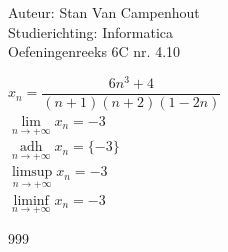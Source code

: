 \documentclass[a4paper]{article}
\begin{document}
  
\noindent \large Auteur: Stan Van Campenhout \\
\noindent \large Studierichting:  Informatica\\
\noindent \large Oefeningenreeks 6C nr. 4.10\\

\medskip

\normalsize

$ x_n = \dfrac{6n^3+4}{\left(n+1\right)\left(n+2\right)\left(1-2n\right)} $\\

$ \lim\limits_{n\rightarrow+\infty}x_n = -3 $\\

$\displaystyle \mathop{\mathrm{adh}}\limits_{n \rightarrow +\infty} x_n = \{-3\}$\\

$ \limsup\limits_{n\rightarrow+\infty} x_n = -3 $\\

$ \liminf\limits_{n\rightarrow+\infty} x_n = -3 $\\

\begin{thebibliography}{999}
\end{thebibliography}
\end{document}
